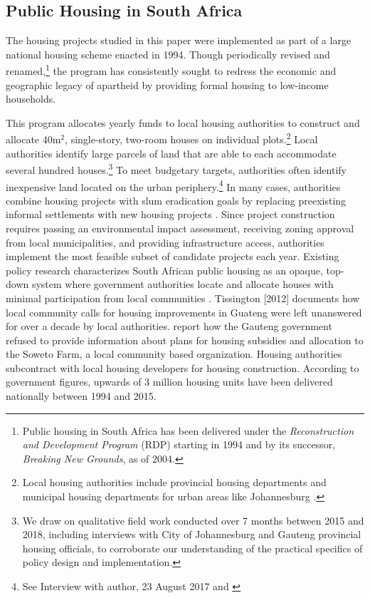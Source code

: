 \documentclass[12pt]{article}
\begin{document}
\subsection{Public Housing in South Africa}


The housing projects studied in this paper were implemented as part of a large national housing scheme enacted in 1994. Though periodically revised and renamed,\footnote{Public housing in South Africa has been delivered under the {\it Reconstruction and Development Program} (RDP) starting in 1994 and  by its successor, {\it Breaking New Grounds}, as of 2004.} the program has consistently sought to redress the economic and geographic legacy of apartheid by providing formal housing to low-income households.  

This program allocates yearly funds to local housing authorities to construct and allocate 40m$^2$, single-story, two-room houses on individual plots.\footnote{Local housing authorities include provincial housing departments and municipal housing departments for urban areas like Johannesburg \citep{dhsreports}.}  Local authorities identify large parcels of land that are able to each accommodate several hundred houses.\footnote{We draw on qualitative field work conducted over 7 months between 2015 and 2018, including interviews with City of Johannesburg and Gauteng provincial housing officials, to corroborate our understanding of the practical specifics of policy design and implementation.}  To meet budgetary targets, authorities often identify inexpensive land located on the urban periphery.\footnote{See Interview with author, 23 August 2017 and \cite{dhsreports}}  In many cases, authorities combine housing projects with slum eradication goals by replacing preexisting informal settlements with new housing projects \citep{hofmeyr2008risk}.  Since project construction requires passing an environmental impact assessment, receiving zoning approval from local municipalities, and providing infrastructure access, authorities implement the most feasible subset of candidate projects each year.  Existing policy research characterizes South African public housing as an opaque, top-down system where government authorities locate and allocate houses with minimal participation from local communities \citep{seriq}.  Tissington [2012] documents how local community calls for housing improvements in Guateng were left unanswered for over a decade by local authorities.  \cite{seriq} report how the Gauteng government refused to provide information about plans for housing subsidies and allocation to the Soweto Farm, a local community based organization.   Housing authorities subcontract with local housing developers for housing construction.  According to government figures, upwards of 3 million housing units have been delivered nationally between 1994 and 2015.
\end{document}
